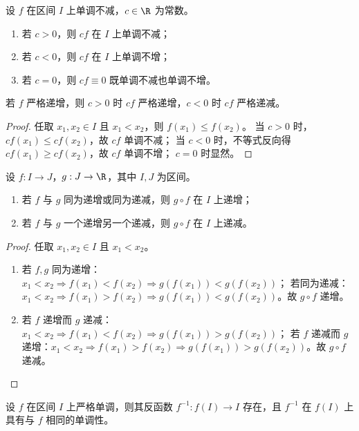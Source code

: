 \begin{proposition}
	设 $f$ 在区间 $I$ 上单调不减，$c \in \R$ 为常数。
	\begin{enumerate}
		\item 若 $c > 0$，则 $c f$ 在 $I$ 上单调不减；
		\item 若 $c < 0$，则 $c f$ 在 $I$ 上单调不增；
		\item 若 $c = 0$，则 $c f \equiv 0$ 既单调不减也单调不增。
	\end{enumerate}
	若 $f$ 严格递增，则 $c>0$ 时 $cf$ 严格递增，$c<0$ 时 $cf$ 严格递减。
\end{proposition}

\begin{proof}
	任取 $x_1, x_2 \in I$ 且 $x_1 < x_2$，则 $f(x_1) \leqslant f(x_2)$。
	当 $c > 0$ 时，$c f(x_1) \leqslant c f(x_2)$，故 $cf$ 单调不减；
	当 $c < 0$ 时，不等式反向得 $c f(x_1) \geqslant c f(x_2)$，故 $cf$ 单调不增；
	$c = 0$ 时显然。
\end{proof}

\begin{proposition}[复合函数的单调性]
	设 $f: I \to J$，$g: J \to \R$，其中 $I, J$ 为区间。
	\begin{enumerate}
		\item 若 $f$ 与 $g$ 同为递增或同为递减，则 $g \circ f$ 在 $I$ 上递增；
		\item 若 $f$ 与 $g$ 一个递增另一个递减，则 $g \circ f$ 在 $I$ 上递减。
	\end{enumerate}
\end{proposition}

\begin{proof}
	任取 $x_1, x_2 \in I$ 且 $x_1 < x_2$。
	\begin{enumerate}
		\item 若 $f, g$ 同为递增：$x_1 < x_2 \Rightarrow f(x_1) < f(x_2) \Rightarrow g(f(x_1)) < g(f(x_2))$；
		若同为递减：$x_1 < x_2 \Rightarrow f(x_1) > f(x_2) \Rightarrow g(f(x_1)) < g(f(x_2))$。故 $g \circ f$ 递增。
		\item 若 $f$ 递增而 $g$ 递减：$x_1 < x_2 \Rightarrow f(x_1) < f(x_2) \Rightarrow g(f(x_1)) > g(f(x_2))$；
		若 $f$ 递减而 $g$ 递增：$x_1 < x_2 \Rightarrow f(x_1) > f(x_2) \Rightarrow g(f(x_1)) > g(f(x_2))$。故 $g \circ f$ 递减。
	\end{enumerate}
\end{proof}

\begin{proposition}[反函数的单调性]
	设 $f$ 在区间 $I$ 上严格单调，则其反函数 $f^{-1}: f(I) \to I$ 存在，且 $f^{-1}$ 在 $f(I)$ 上具有与 $f$ 相同的单调性。
\end{proposition}

